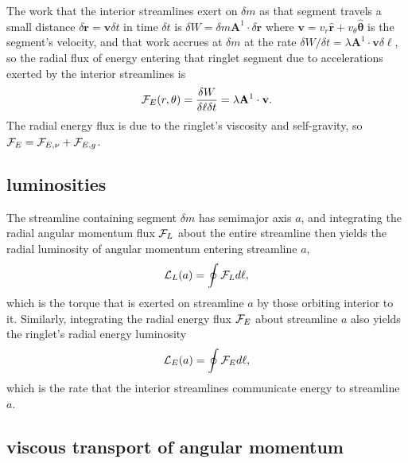 \documentclass[preprint]{aastex62}
\begin{document}
The work that the interior streamlines exert on $\delta m$ as that segment travels a small distance
$\delta\mathbf{r}=\mathbf{v}\delta t$ in time $\delta t$
is $\delta W=\delta m\mathbf{A}^1\cdot\delta\mathbf{r}$ where 
$\mathbf{v}=v_r\hat{\mathbf{r}} + v_\theta\hat{\boldsymbol\theta}$ is the segment's velocity, and
that work accrues at $\delta m$ at the rate 
$\delta W/\delta t=\lambda\mathbf{A}^1\cdot\mathbf{v}\delta\ell$,
so the radial flux of energy entering that ringlet segment due to accelerations
exerted by the interior streamlines is 
\begin{equation}
    \label{eqn:F_E}
    {\cal F}_E(r, \theta) = \frac{\delta W}{\delta\ell\delta t} = \lambda\mathbf{A}^1\cdot\mathbf{v}.
\end{equation}
The radial energy flux is due to the ringlet's viscosity and self-gravity, so
${\cal F}_E = {\cal F}_{E,\nu} + {\cal F}_{E,g}$. 

\subsection{luminosities}
\label{subsec:luminosities}

The streamline containing segment $\delta m$ has semimajor axis $a$, and 
integrating the radial angular momentum flux ${\cal F}_L$ about the entire streamline
then yields the radial luminosity of angular momentum entering streamline $a$,
\begin{equation}
    \label{eqn:L_L}
    {\cal L}_L(a) = \oint {\cal F}_Ld\ell , 
\end{equation}
which is the torque that is exerted on streamline $a$ by those orbiting interior to it. Similarly,
integrating the radial energy flux ${\cal F}_E$ about streamline $a$ also yields the ringlet's radial energy luminosity
\begin{equation}
    \label{eqn:L_E}
    {\cal L}_E(a) = \oint {\cal F}_Ed\ell,
\end{equation}
which is the rate that the interior streamlines communicate energy to streamline $a$.

\subsection{viscous transport of angular momentum}
\label{subsec:viscous_flux}
\end{document}
